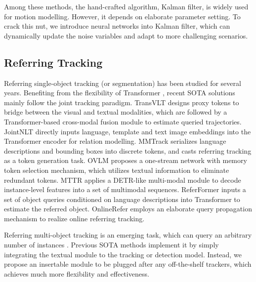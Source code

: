 \documentclass[10pt,twocolumn,letterpaper]{article}
\begin{document}
    Among these methods, the hand-crafted algorithm, Kalman filter, is widely used for motion modelling.
    However, it depends on elaborate parameter setting.
    To crack this nut, we introduce neural networks into Kalman filter, which can dynamically update the noise variables and adapt to more challenging scenarios.

\subsection{Referring Tracking}
    Referring single-object tracking (or segmentation) has been studied for several years.
    Benefiting from the flexibility of Transformer \cite{vaswani2017attention}, recent SOTA solutions mainly follow the joint tracking paradigm.
    TransVLT \cite{zhao2023transformer} designs proxy tokens to bridge between the visual and textual modalities, 
    which are followed by a Transformer-based cross-modal fusion module to estimate queried trajectories.
    JointNLT \cite{zhou2023joint} directly inputs language, template and text image embeddings into the Transformer encoder for relation modelling.
    MMTrack \cite{zheng2023towards} serializes language descriptions and bounding boxes into discrete tokens, and casts referring tracking as a token generation task.
    OVLM \cite{zhang2023one} proposes a one-stream network with memory token selection mechanism, which utilizes textual information to eliminate redundant tokens.
    MTTR \cite{botach2022end} applies a DETR-like \cite{carion2020end} multi-modal module to decode instance-level features into a set of multimodal sequences.
    ReferFormer \cite{wu2022language} inputs a set of object queries conditioned on language descriptions into Transformer to estimate the referred object.
    OnlineRefer \cite{wu2023onlinerefer} employs an elaborate query propagation mechanism to realize online referring tracking.

    Referring multi-object tracking is an emerging task, which can query an arbitrary number of instances \cite{wu2023referring}.
    Previous SOTA methods implement it by simply integrating the textual module to the tracking or detection model.
    Instead, we propose an insertable module to be plugged after any off-the-shelf trackers, which achieves much more flexibility and effectiveness.
    
\end{document}
